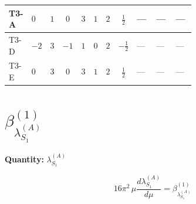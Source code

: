 \documentclass[8pt]{article}
\begin{document}
\begin{landscape}
\begin{longtable}{@{}llcccccc >{\raggedright\arraybackslash}p{0.21\linewidth} >{\raggedright\arraybackslash}p{0.21\linewidth} >{\raggedright\arraybackslash}p{0.21\linewidth}@{}}
\midrule
T3-A & $0$ & $1$ & $0$ & $3$ & $1$ & $2$ & $\frac{1}{2}$ & --- & --- & --- \\
\midrule
T3-D & $-2$ & $3$ & $-1$ & $1$ & $0$ & $2$ & $-\frac{1}{2}$ & --- & --- & --- \\
\midrule
T3-E & $0$ & $3$ & $0$ & $3$ & $1$ & $2$ & $\frac{1}{2}$ & --- & --- & --- \\
\midrule
\bottomrule
\end{longtable}
\clearpage
\section*{$\beta_{\lambda_{S_1}^{(A)}}^{(1)}$}
\noindent\textbf{Quantity: }$\lambda_{S_1}^{(A)}$\par\smallskip
\[16\pi^2\,\mu\frac{d \lambda_{S_1}^{(A)}}{d\mu}=\beta_{\lambda_{S_1}^{(A)}}^{(1)}\]

\end{landscape}
\end{document}

